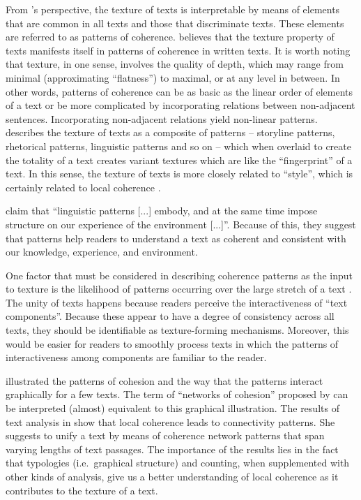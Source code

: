 From 's perspective, the texture of texts is interpretable by means of elements that are common in all texts and those that discriminate texts. 
These elements are referred to as patterns of coherence. 
 believes that the texture property of texts manifests itself in patterns of coherence in written texts. 
It is worth noting that texture, in one sense, involves the quality of depth, which may range from minimal (approximating ``flatness'') to maximal, or at any level in between. 
In other words, patterns of coherence can be as basic as the linear order of elements of a text or be more complicated by incorporating relations between non-adjacent sentences. 
Incorporating non-adjacent relations yield non-linear patterns. 
 describes the texture of texts as a composite of patterns -- storyline patterns, rhetorical patterns, linguistic patterns and so on -- which when overlaid to create the totality of a text creates variant textures which are like the ``fingerprint'' of a text. 
In this sense, the texture of texts is more closely related to ``style'', which is certainly related to local coherence \cite{barzilay08}. 

 claim that ``linguistic patterns  [...] embody, and at the same time impose structure on our experience of the environment [...]''.
Because of this, they suggest that patterns help readers to understand a text as coherent and consistent with our knowledge, experience, and environment. 

One factor that must be considered in describing coherence patterns as the input to texture is the likelihood of patterns occurring over the large stretch of a text \cite{stoddard91}.  
The unity of texts happens because readers perceive the interactiveness of ``text components''. 
Because these appear to have a degree of consistency across all texts, they should be identifiable as texture-forming mechanisms.
Moreover, this would be easier for readers to smoothly process texts in which the patterns of interactiveness among components are familiar to the reader.  

 illustrated the patterns of cohesion and the way that the patterns interact graphically for a few texts. 
The term of ``networks of cohesion'' proposed by  can be interpreted (almost) equivalent to this graphical illustration. 
The results of text analysis in  show that local coherence leads to connectivity patterns.
She suggests to unify a text by means of coherence network patterns that span varying lengths of text passages. 
The importance of the results lies in the fact that typologies (i.e.\ graphical structure) and counting, when supplemented with other kinds of analysis, give us a better understanding of local coherence as it contributes to the texture of a text. 

